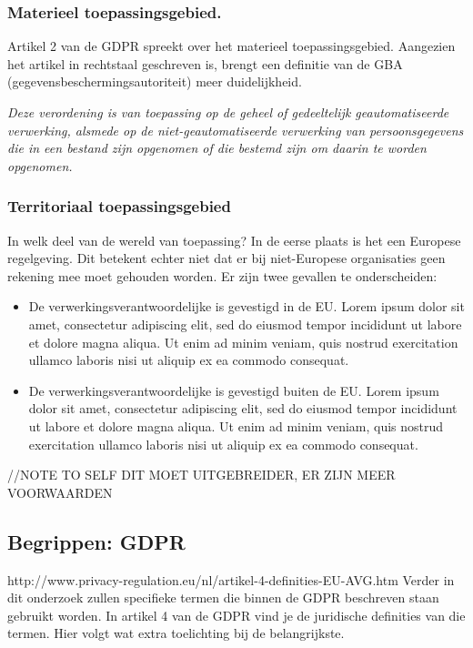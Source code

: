 \subsubsection{Materieel toepassingsgebied.}
Artikel 2 van de GDPR spreekt over het materieel toepassingsgebied. Aangezien het artikel in rechtstaal geschreven is, brengt een definitie van de GBA (gegevensbeschermingsautoriteit) meer duidelijkheid. 

\textit{Deze verordening is van toepassing op de geheel of gedeeltelijk geautomatiseerde verwerking, alsmede op de niet-geautomatiseerde verwerking van persoonsgegevens die in een bestand zijn opgenomen of die bestemd zijn om daarin te worden opgenomen.}

\subsubsection{Territoriaal toepassingsgebied}
In welk deel van de wereld van toepassing? In de eerse plaats is het een Europese regelgeving. Dit betekent echter niet dat er bij niet-Europese organisaties geen rekening mee moet gehouden worden. Er zijn twee gevallen te onderscheiden: 

\begin{itemize}
	\item De verwerkingsverantwoordelijke is gevestigd in de EU. 
	\subitem Lorem ipsum dolor sit amet, consectetur adipiscing elit, sed do eiusmod tempor incididunt ut labore et dolore magna aliqua. Ut enim ad minim veniam, quis nostrud exercitation ullamco laboris nisi ut aliquip ex ea commodo consequat. 
	\item De verwerkingsverantwoordelijke is gevestigd buiten de EU. 
	\subitem Lorem ipsum dolor sit amet, consectetur adipiscing elit, sed do eiusmod tempor incididunt ut labore et dolore magna aliqua. Ut enim ad minim veniam, quis nostrud exercitation ullamco laboris nisi ut aliquip ex ea commodo consequat. 
\end{itemize}

//NOTE TO SELF DIT MOET UITGEBREIDER, ER ZIJN MEER VOORWAARDEN 


\subsection{{Begrippen: GDPR}}
http://www.privacy-regulation.eu/nl/artikel-4-definities-EU-AVG.htm
Verder in dit onderzoek zullen specifieke termen die binnen de GDPR beschreven staan gebruikt worden.
In artikel 4 van de GDPR vind je de juridische definities van die termen. Hier volgt wat extra toelichting bij de belangrijkste. 

